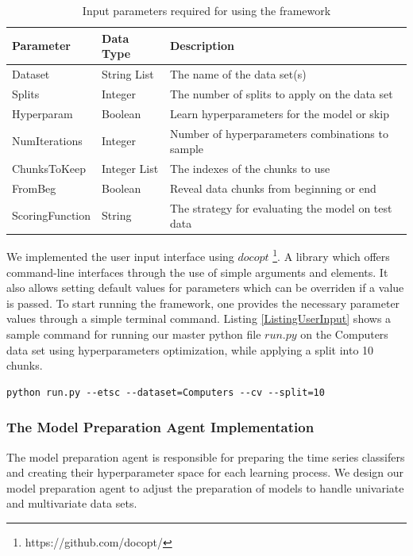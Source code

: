 \begin{table}[hbt!]
  \setlength\extrarowheight{2pt} %
  \begin{tabularx}{\textwidth}{|X|X|X|}
  \hline
  \textbf{Parameter} & \textbf{Data Type} & \textbf{Description} \\ \hline
    Dataset         & String List        & The name of the data set(s)                        \\ \hline
    Splits          & Integer            & The number of splits to apply on the data set      \\ \hline
    Hyperparam      & Boolean            & Learn hyperparameters for the model or skip        \\ \hline
    NumIterations   & Integer            & Number of hyperparameters combinations to sample   \\ \hline
    ChunksToKeep    & Integer List       & The indexes of the chunks to use                   \\ \hline
    FromBeg         & Boolean            & Reveal data chunks from beginning or end           \\ \hline
    ScoringFunction & String             & The strategy for evaluating the model on test data \\ \hline
  \end{tabularx}
  \caption{Input parameters required for using the framework}
  \label{TableUserInput}
\end{table}

We implemented the user input interface using $docopt$ \footnote{https://github.com/docopt/}. A library which offers command-line interfaces through
the use of simple arguments and elements. It also allows setting default values for parameters which can be overriden if a value is passed.
To start running the framework, one provides the necessary parameter values through a simple terminal command.
Listing \ref{ListingUserInput} shows a sample command for running our master python file $run.py$ on the Computers data set using hyperparameters optimization,
while applying a split into 10 chunks.

\lstset{basicstyle=\ttfamily\small}
\begin{lstlisting}[language=Comsol,caption={Sample command for providing user input to the framework},captionpos=b,label={ListingUserInput}]
  python run.py --etsc --dataset=Computers --cv --split=10
\end{lstlisting}

\subsubsection*{The Model Preparation Agent Implementation}
\label{ModelPreparationAgentImplementation}
The model preparation agent is responsible for preparing the time series classifers and creating their hyperparameter space for each learning process.
We design our model preparation agent to adjust the preparation of models to handle univariate and multivariate data sets.

